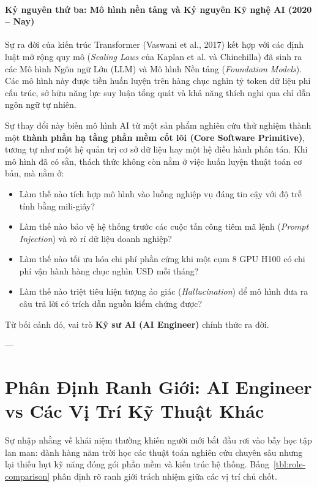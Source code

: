 \paragraph{Kỷ nguyên thứ ba: Mô hình nền tảng và Kỷ nguyên Kỹ nghệ AI (2020 -- Nay)}
Sự ra đời của kiến trúc Transformer (Vaswani et al., 2017) kết hợp với các định luật mở rộng quy mô (\textit{Scaling Laws} của Kaplan et al. và Chinchilla) đã sinh ra các Mô hình Ngôn ngữ Lớn (LLM) và Mô hình Nền tảng (\textit{Foundation Models}). Các mô hình này được tiền huấn luyện trên hàng chục nghìn tỷ token dữ liệu phi cấu trúc, sở hữu năng lực suy luận tổng quát và khả năng thích nghi qua chỉ dẫn ngôn ngữ tự nhiên. 

Sự thay đổi này biến mô hình AI từ một sản phẩm nghiên cứu thử nghiệm thành một \textbf{thành phần hạ tầng phần mềm cốt lõi (Core Software Primitive)}, tương tự như một hệ quản trị cơ sở dữ liệu hay một hệ điều hành phân tán. Khi mô hình đã có sẵn, thách thức không còn nằm ở việc huấn luyện thuật toán cơ bản, mà nằm ở:
\begin{itemize}
  \item Làm thế nào tích hợp mô hình vào luồng nghiệp vụ đáng tin cậy với độ trễ tính bằng mili-giây?
  \item Làm thế nào bảo vệ hệ thống trước các cuộc tấn công tiêm mã lệnh (\textit{Prompt Injection}) và rò rỉ dữ liệu doanh nghiệp?
  \item Làm thế nào tối ưu hóa chi phí phần cứng khi một cụm 8 GPU H100 có chi phí vận hành hàng chục nghìn USD mỗi tháng?
  \item Làm thế nào triệt tiêu hiện tượng ảo giác (\textit{Hallucination}) để mô hình đưa ra câu trả lời có trích dẫn nguồn kiểm chứng được?
\end{itemize}

Từ bối cảnh đó, vai trò \textbf{Kỹ sư AI (AI Engineer)} chính thức ra đời.

---

\section{Phân Định Ranh Giới: AI Engineer vs Các Vị Trí Kỹ Thuật Khác}
\label{sec:role-definition}

Sự nhập nhằng về khái niệm thường khiến người mới bắt đầu rơi vào bẫy học tập lan man: dành hàng năm trời học các thuật toán nghiên cứu chuyên sâu nhưng lại thiếu hụt kỹ năng đóng gói phần mềm và kiến trúc hệ thống. Bảng~\ref{tbl:role-comparison} phân định rõ ranh giới trách nhiệm giữa các vị trí chủ chốt.

